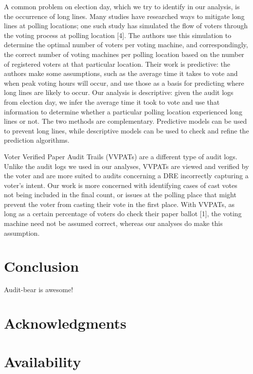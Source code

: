 \documentclass[letterpaper,twocolumn,10pt]{article}
\begin{document}
A common problem on election day, which we try to identify in our analysis, is the occurrence of long lines. Many studies have researched ways to mitigate long lines at polling locations; one such study has simulated the flow of voters through the voting process at polling location [4]. The authors use this simulation to determine the optimal number of voters per voting machine, and correspondingly, the correct number of voting machines per polling location based on the number of registered voters at that particular location. Their work is predictive: the authors make some assumptions, such as the average time it takes to vote and when peak voting hours will occur, and use those as a basis for predicting where long lines are likely to occur. Our analysis is descriptive: given the audit logs from election day, we infer the average time it took to vote and use that information to determine whether a particular polling location experienced long lines or not. The two methods are complementary. Predictive models can be used to prevent long lines, while descriptive models can be used to check and refine the prediction algorithms.

Voter Verified Paper Audit Trails (VVPATs) are a different type of audit logs. Unlike the audit logs we used in our analyses, VVPATs are viewed and verified by the voter and are more suited to audits concerning a DRE incorrectly capturing a voter’s intent. Our work is more concerned with identifying cases of cast votes not being included in the final count, or issues at the polling place that might prevent the voter from casting their vote in the first place. With VVPATs, as long as a certain percentage of voters do check their paper ballot [1], the voting machine need not be assumed correct, whereas our analyses do make this assumption.

\section{Conclusion}
Audit-bear is awesome!

\section{Acknowledgments}
\section{Availability}



\end{document}
